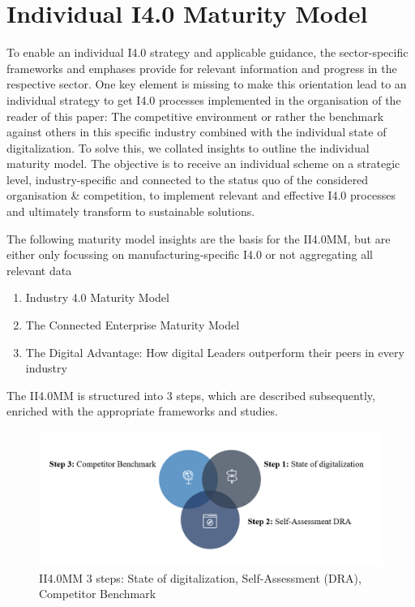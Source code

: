 \section{Individual I4.0 Maturity Model}

To enable an individual \ac{I4.0} strategy and applicable guidance, the sector-specific frameworks and emphases provide for relevant information and progress in the respective sector. One key element is missing to make this orientation lead to an individual strategy to get \ac{I4.0} processes implemented in the organisation of the reader of this paper: The competitive environment or rather the benchmark against others in this specific industry combined with the individual state of digitalization. To solve this, we collated insights to outline the individual maturity model. The objective is to receive an individual scheme on a strategic level, industry-specific and connected to the status quo of the considered organisation \& competition, to implement relevant and effective \ac{I4.0} processes and ultimately transform to sustainable solutions.

The following maturity model insights are the basis for the \ac{II4.0MM}, but are either only focussing on manufacturing-specific \ac{I4.0} or not aggregating all relevant data

\begin{enumerate}
\item Industry 4.0 Maturity Model \cite{Schumacher2016161}
\item The Connected Enterprise Maturity Model \cite{RockWellAutomation-connectedEnterpriseMaturityModel}
\item The Digital Advantage: How digital Leaders outperform their peers in every industry \cite{CapgeminiMaturityModelDigitalAdvantage}
\end{enumerate}

The \ac{II4.0MM} is structured into 3 steps, which are described subsequently, enriched with the appropriate frameworks and studies.


\begin{figure}[H]
\centering
\includegraphics[width=1\columnwidth]{images/II40MM_grafik.PNG}
\caption{\ac{II4.0MM} 3 steps: State of digitalization, Self-Assessment (DRA), Competitor Benchmark}
\end{figure}

